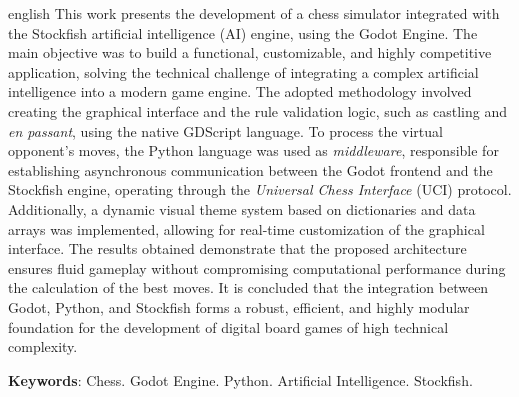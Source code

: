 \begin{resumo}[Abstract]
	\begin{otherlanguage*}{english}
		This work presents the development of a chess simulator integrated with the Stockfish artificial intelligence (AI) engine, using the Godot Engine. The main objective was to build a functional, customizable, and highly competitive application, solving the technical challenge of integrating a complex artificial intelligence into a modern game engine. The adopted methodology involved creating the graphical interface and the rule validation logic, such as castling and \textit{en passant}, using the native GDScript language. To process the virtual opponent's moves, the Python language was used as \textit{middleware}, responsible for establishing asynchronous communication between the Godot frontend and the Stockfish engine, operating through the \textit{Universal Chess Interface} (UCI) protocol. Additionally, a dynamic visual theme system based on dictionaries and data arrays was implemented, allowing for real-time customization of the graphical interface. The results obtained demonstrate that the proposed architecture ensures fluid gameplay without compromising computational performance during the calculation of the best moves. It is concluded that the integration between Godot, Python, and Stockfish forms a robust, efficient, and highly modular foundation for the development of digital board games of high technical complexity.

		\vspace*{1\onelineskip}
 
		\textbf{Keywords}: Chess. Godot Engine. Python. Artificial Intelligence. Stockfish.
	\end{otherlanguage*}
\end{resumo}